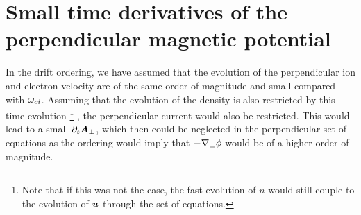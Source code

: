 \section{Small time derivatives of the perpendicular magnetic potential}
%
In the drift ordering, we have assumed that the evolution of the perpendicular ion and electron velocity are of the same order of magnitude and small compared with $\omega_{ci}$.
Assuming that the evolution of the density is also restricted by this time evolution%
%
\footnote{Note that if this was not the case, the fast evolution of $n$ would still couple to the evolution of $\boldsymbol{u}$ through the set of equations.}%
%
, the perpendicular current would also be restricted.
This would lead to a small $\partial_t \boldsymbol{A}_\perp$, which then could be neglected in the perpendicular set of equations as the ordering would imply that $-\nabla_\perp\phi$ would be of a higher order of magnitude.

